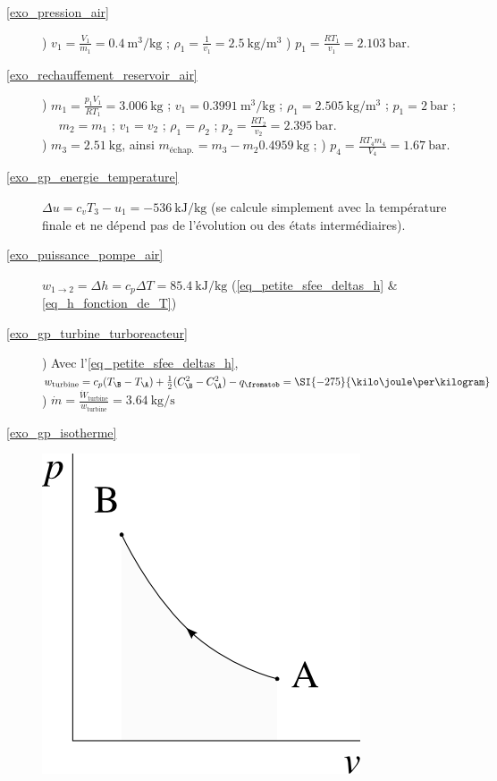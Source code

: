 \exercisesolutionpage
\titreresultats

\begin{description}
	\item [\ref{exo_pression_air}]
					) $v_1 = \frac{V_1}{m_1} = \SI{0,4}{\metre\cubed\per\kilogram}$ ; $\rho_1 = \frac{1}{v_1} = \SI{2,5}{\kilogram\per\metre\cubed}$
					) $p_1 = \frac{R T_1}{v_1} = \SI{2,103}{\bar}$.
	\item [\ref{exo_rechauffement_reservoir_air}]
					) $m_1 = \frac{p_1 V_1}{R T_1} = \SI{3,006}{\kilogram}$ ; $v_1 = \SI{0,3991}{\metre\cubed\per\kilogram}$ ; $\rho_1 = \SI{2,505}{\kilogram\per\metre\cubed}$ ; $p_1 = \SI{2}{\bar}$ ;
					\tab ~~ $m_2 = m_1$ ; $v_1 = v_2$ ; $\rho_1 = \rho_2$ ; $p_2 = \frac{R T_2}{v_2} = \SI{2,395}{\bar}$.\\
					) $m_3 = \SI{2,51}{\kilogram}$, ainsi $m_\text{échap.} = m_3 - m_2 \SI{0,4959}{\kilogram}$ ;
					) $p_4 = \frac{R T_4 m_4}{V_4} = \SI{1,67}{\bar}$.
	\item [\ref{exo_gp_energie_temperature}]
					\tab $\Delta u = c_v T_3 - u_1 = \SI{-536}{\kilo\joule\per\kilogram}$ (se calcule simplement avec la température finale et ne dépend pas de l’évolution ou des états intermédiaires).
	\item [\ref{exo_puissance_pompe_air}]
					\tab $w_{1\to 2} = \Delta h = c_p \Delta T = \SI{+85,4}{\kilo\joule\per\kilogram}$ (\ref{eq_petite_sfee_deltas_h} \& \ref{eq_h_fonction_de_T})
	\item [\ref{exo_gp_turbine_turboreacteur}]
					) Avec l’\cref{eq_petite_sfee_deltas_h}, $w_\text{turbine} = c_p (T_\B - T_\A) + \frac{1}{2}(C_\B^2 - C_\A^2) - q_\fromatob = \SI{-275}{\kilo\joule\per\kilogram}$ 	
					) $\dot m = \frac{\dot W_\text{turbine}}{w_\text{turbine}} = \SI{3,64}{\kilogram\per\second}$
	\item [\ref{exo_gp_isotherme}]
					\includegraphics[width=\solutiondiagramwidth]{images/exo_sol_pv_isoth.png}

\end{description}

